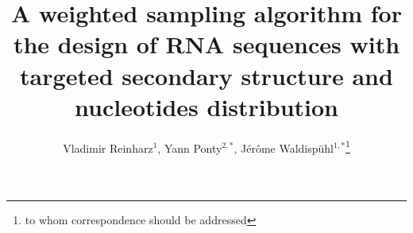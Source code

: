 \documentclass{bioinfo}
\begin{document}

\title{A weighted sampling algorithm for the design of RNA sequences with targeted secondary structure and nucleotides distribution}
\author{Vladimir Reinharz$^1$, Yann Ponty$^{2,*}$, J\'er\^{o}me Waldisp\"{u}hl$^{1,*}$\footnote{to whom correspondence should be addressed}}
\address{$^1$ School of Computer Science, McGill University, Montreal, Canada\\ $^2$ Laboratoire d'informatique, \'Ecole Polytechnique, Palaiseau, France.}



\maketitle
\end{document}

